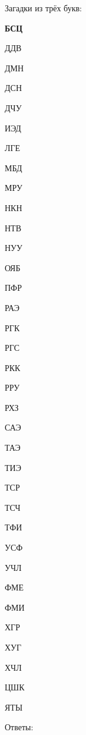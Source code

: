 Загадки из трёх букв:
\begin{multicols}{4}
{\bf
БСЦ

ДДВ

ДМН

ДСН

ДЧУ

ИЭД

ЛГЕ

МБД

МРУ

НКН

НТВ

НУУ

ОЯБ

ПФР

РАЭ

РГК

РГС

РКК

РРУ

РХЗ

САЭ

ТАЭ

ТИЭ

ТСР

ТСЧ

ТФИ

УСФ

УЧЛ

ФМЕ

ФМИ

ХГР

ХУГ

ХЧЛ

ЦШК

ЯТЫ
}
\end{multicols}

Ответы:


